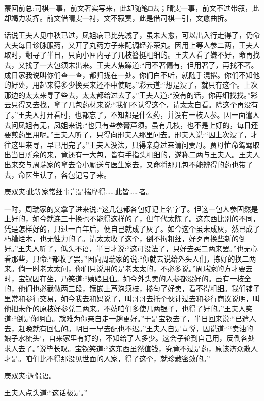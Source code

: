 

\begin{parag}
    \begin{note}蒙回前总:司棋一事，前文著实写来，此却随笔□去；晴雯一事，前文不过带叙，此却竭力发挥。前文借晴雯一衬，文不寂寞，此是借司棋一引，文愈曲折。\end{note}
\end{parag}


\begin{parag}
    话说王夫人见中秋已过，凤姐病已比先减了，虽未大愈，可以出入行走得了，仍命大夫每日诊脉服药，又开了丸药方子来配调经养荣丸。因用上等人参二两，王夫人取时，翻寻了半日，只向小匣内寻了几枝簪挺粗细的。王夫人看了嫌不好，命再找去，又找了一大包须末出来。王夫人焦躁道:“用不著偏有，但用著了，再找不著。成日家我说叫你们查一查，都归拢在一处。你们白不听，就随手混撂。你们不知他的好处，用起来得多少换买来还不中使呢。”彩云道:“想是没了，就只有这个。上次那边的太太来寻了些去，太太都给过去了。”王夫人道:“没有的话，你再细找找。”彩云只得又去找，拿了几包药材来说:“我们不认得这个，请太太自看。除这个再没有了。”王夫人打开看时，也都忘了，不知都是什么药，并没有一枝人参。因一面遣人去问凤姐有无，凤姐来说:“也只有些参膏芦须。虽有几枝，也不是上好的，每日还要煎药里用呢。”王夫人听了，只得向邢夫人那里问去。邢夫人说:“因上次没了，才往这里来寻，早已用完了。”王夫人没法，只得亲身过来请问贾母。贾母忙命鸳鸯取出当日所余的来，竟还有一大包，皆有手指头粗细的，遂称二两与王夫人。王夫人出来交与周瑞家的拿去令小厮送与医生家去，又命将那几包不能辨得的药也带了去，命医生认了，各包记号了来。\begin{note}庚双夹:此等家常细事岂是揣摩得……此皆……者。\end{note}
\end{parag}


\begin{parag}
    一时，周瑞家的又拿了进来说:“这几包都各包好记上名字了。但这一包人参固然是上好的，如今就连三十换也不能得这样的了，但年代太陈了。这东西比别的不同，凭是怎样好的，只过一百年后，便自己就成了灰了。如今这个虽未成灰，然已成了朽糟烂木，也无性力的了。请太太收了这个，倒不拘粗细，好歹再换些新的倒好。”王夫人听了，低头不语，半日才说:“这可没法了，只好去买二两来罢。”也无心看那些，只命:“都收了罢。”因向周瑞家的说:“你就去说给外头人们，拣好的换二两来。倘一时老太太问，你们只说用的是老太太的，不必多说。”周瑞家的方才要去时，宝钗因在坐，乃笑道:“姨娘且住。如今外头卖的人参都没好的。虽有一枝全的，他们也必截做两三段，镶嵌上芦泡须枝，掺匀了好卖，看不得粗细。我们铺子里常和参行交易，如今我去和妈说了，叫哥哥去托个伙计过去和参行商议说明，叫他把未作的原枝好参兑二两来。不妨咱们多使几两银子，也得了好的。”王夫人笑道:“倒是你明白。就难为你亲自走一趟更好。”于是宝钗去了，半日回来说:“已遣人去，赶晚就有回信的。明日一早去配也不迟。”王夫人自是喜悦，因说道:“‘卖油的娘子水梳头’，自来家里有好的，不知给了人多少。这会子轮到自己用，反倒各处求人去了。”说毕长叹。宝钗笑道:“这东西虽然值钱，究竟不过是药，原该济众散人才是。咱们比不得那没见世面的人家，得了这个，就珍藏密敛的。”\begin{note}庚双夹:调侃语。\end{note}王夫人点头道:“这话极是。”
\end{parag}



